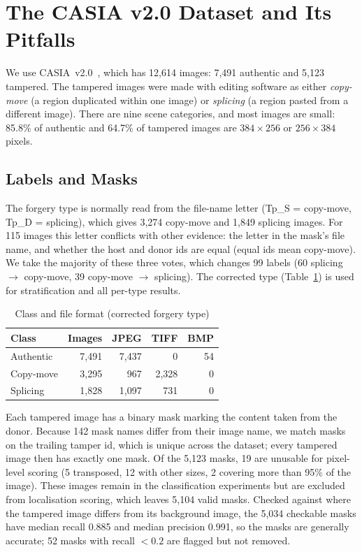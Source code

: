 \section{The CASIA v2.0 Dataset and Its Pitfalls}\label{sec:dataset}

We use CASIA~v2.0~\cite{dong2013casia}, which has 12,614 images: 7,491 authentic and 5,123 tampered. The tampered
images were made with editing software as either \emph{copy-move} (a region duplicated within one image) or
\emph{splicing} (a region pasted from a different image). There are nine scene categories, and most images are
small: 85.8\% of authentic and 64.7\% of tampered images are $384\times256$ or $256\times384$ pixels.

\subsection{Labels and Masks}\label{sec:dataset-labels}

The forgery type is normally read from the file-name letter (Tp\_S = copy-move, Tp\_D = splicing), which gives
3,274 copy-move and 1,849 splicing images. For 115 images this letter conflicts with other evidence: the letter in
the mask's file name, and whether the host and donor ids are equal (equal ids mean copy-move). We take the majority
of these three votes, which changes 99 labels (60 splicing $\rightarrow$ copy-move, 39 copy-move $\rightarrow$
splicing). The corrected type (Table~\ref{tab:dataset-format}) is used for stratification and all per-type
results.

\begin{table}[t]
\centering
\caption{Class and file format (corrected forgery type)}\label{tab:dataset-format}
\footnotesize
\begin{tabular}{lrrrr}
\toprule
Class & Images & JPEG & TIFF & BMP \\
\midrule
Authentic & 7,491 & 7,437 & 0 & 54 \\
Copy-move & 3,295 & 967 & 2,328 & 0 \\
Splicing & 1,828 & 1,097 & 731 & 0 \\
\bottomrule
\end{tabular}
\end{table}

Each tampered image has a binary mask marking the content taken from the donor. Because 142 mask names differ
from their image name, we match masks on the trailing tamper id, which is unique across the dataset; every tampered
image then has exactly one mask. Of the 5,123 masks, 19 are unusable for pixel-level scoring (5 transposed, 12
with other sizes, 2 covering more than 95\% of the image). These images remain in the classification experiments
but are excluded from localisation scoring, which leaves 5,104 valid masks. Checked against where the tampered image
differs from its background image, the 5,034 checkable masks have median recall 0.885 and median precision 0.991,
so the masks are generally accurate; 52 masks with recall $<0.2$ are flagged but not removed.

